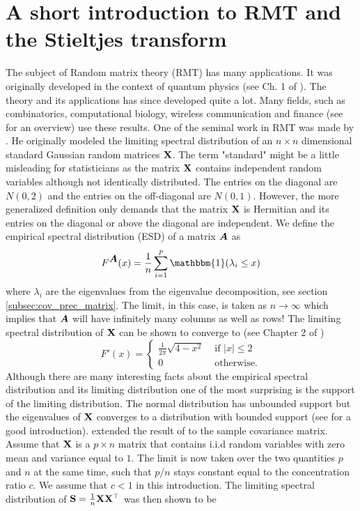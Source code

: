 \documentclass[]{book}\usepackage{knitr}
\begin{document}
\section{A short introduction to RMT and the Stieltjes transform}
The subject of Random matrix theory (RMT) has many applications. It was originally developed in the context of quantum physics (see Ch. 1 of \citet{mehta2004random}). The theory and its applications has since developed quite a lot. Many fields, such as combinatorics, computational biology, wireless communication and finance (see \citet{REF} for an overview) use these results. One of the seminal work in RMT was made by \citet{wigner1993characteristic}. He originally modeled the limiting spectral distribution of an $n \times n$ dimensional standard Gaussian random matrices $\mathbf{X}$. The term "standard" might be a little misleading for statisticians as the matrix $\mathbf{X}$ contains independent random variables although not identically distributed. The entries on the diagonal are $N(0,2)$ and the entries on the off-diagonal are $N(0,1)$. However, the more generalized definition only demands that the matrix $\mathbf{X}$ is Hermitian and its entries on the diagonal or above the diagonal are independent. We define the empirical spectral distribution (ESD) of a matrix $\mbox{\boldmath$A$}$ as
$$
F^{\bA}(x)= \frac{1}{n} \sum_{i=1}^p \mathbbm{1}(\lambda_i \leq x)
$$ 
where $\lambda_i$ are the eigenvalues from the eigenvalue decomposition, see section \ref{subsec:cov_prec_matrix}. The limit, in this case, is taken as $n \rightarrow \infty$ which implies that $\mbox{\boldmath$A$}$ will have infinitely many columns as well as rows!
The limiting spectral distribution of $\mathbf{X}$ can be shown to converge to (see Chapter 2 of \citet{bai2010spectral})
$$
F'(x) = \begin{cases}
\frac{1}{2\pi} \sqrt{4-x^2} & \text{ if } |x|\leq 2 \\
0 & \text{ otherwise.}
\end{cases}
$$
Although there are many interesting facts about the empirical spectral distribution and its limiting distribution one of the most surprising is the support of the limiting distribution. The normal distribution has unbounded support but the eigenvalues of $\mathbf{X}$ converges to a distribution with bounded support (see \citet{livan2018introduction} for a good introduction). \citet{zbMATH03244317} extended the result of \citet{wigner1993characteristic} to the sample covariance matrix. Assume that $\mathbf{X}$ is a $p \times n$ matrix that contains i.i.d random variables with zero mean and variance equal to $1$. The limit is now taken over the two quantities $p$ and $n$ at the same time, such that $p/n$ stays constant equal to the concentration ratio $c$. We assume that $c<1$ in this introduction. The limiting spectral distribution of $\mathbf{S}=\frac{1}{n} \mathbf{X} \mathbf{X}^\top$ was then shown to be
\end{document}

